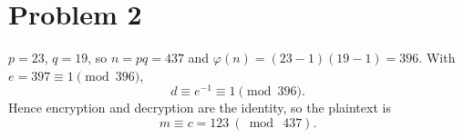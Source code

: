 \section*{Problem 2}

$p=23$, $q=19$, so $n=pq=437$ and $\varphi(n)=(23-1)(19-1)=396$. With $e=397\equiv 1\pmod{396}$,
\[
d\equiv e^{-1}\equiv 1 \pmod{396}.
\]
Hence encryption and decryption are the identity, so the plaintext is
\[
\boxed{m\equiv c=123\ (\bmod\ 437)}.
\]

